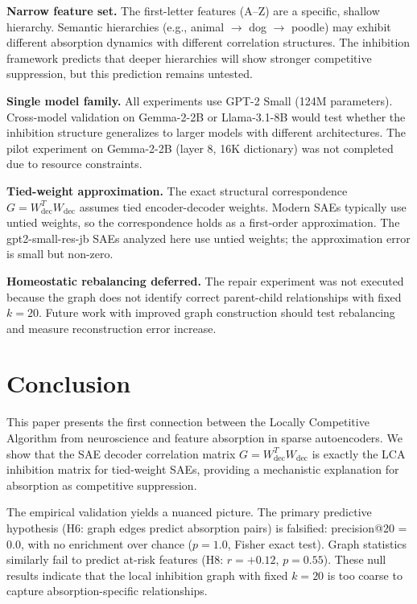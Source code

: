 \documentclass{article}
\begin{document}
\textbf{Narrow feature set.} The first-letter features (A--Z) are a specific, shallow hierarchy. Semantic hierarchies (e.g., animal $\rightarrow$ dog $\rightarrow$ poodle) may exhibit different absorption dynamics with different correlation structures. The inhibition framework predicts that deeper hierarchies will show stronger competitive suppression, but this prediction remains untested.

\textbf{Single model family.} All experiments use GPT-2 Small (124M parameters). Cross-model validation on Gemma-2-2B or Llama-3.1-8B would test whether the inhibition structure generalizes to larger models with different architectures. The pilot experiment on Gemma-2-2B (layer 8, 16K dictionary) was not completed due to resource constraints.

\textbf{Tied-weight approximation.} The exact structural correspondence $G = W_{\text{dec}}^T W_{\text{dec}}$ assumes tied encoder-decoder weights. Modern SAEs typically use untied weights, so the correspondence holds as a first-order approximation. The gpt2-small-res-jb SAEs analyzed here use untied weights; the approximation error is small but non-zero.

\textbf{Homeostatic rebalancing deferred.} The repair experiment was not executed because the graph does not identify correct parent-child relationships with fixed $k = 20$. Future work with improved graph construction should test rebalancing and measure reconstruction error increase.

\section{Conclusion}
\label{sec:conclusion}

This paper presents the first connection between the Locally Competitive Algorithm from neuroscience and feature absorption in sparse autoencoders. We show that the SAE decoder correlation matrix $G = W_{\text{dec}}^T W_{\text{dec}}$ is exactly the LCA inhibition matrix for tied-weight SAEs, providing a mechanistic explanation for absorption as competitive suppression.

The empirical validation yields a nuanced picture. The primary predictive hypothesis (H6: graph edges predict absorption pairs) is falsified: precision@20 = 0.0, with no enrichment over chance ($p = 1.0$, Fisher exact test). Graph statistics similarly fail to predict at-risk features (H8: $r = +0.12$, $p = 0.55$). These null results indicate that the local inhibition graph with fixed $k = 20$ is too coarse to capture absorption-specific relationships.
\end{document}
